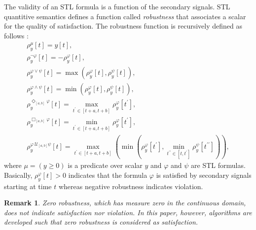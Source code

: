 \documentclass[letterpaper, 10 pt, conference]{ieeeconf}
\newtheorem{remark}{Remark}
\begin{document}
The validity of an STL formula is a function of the secondary signals. STL quantitive semantics defines a function called \emph{robustness} that associates a scalar for the quality of satisfaction. The robustness function is recursively defined as follows \cite{donze}:
\begin{equation}
\label{eq:semantics}
\begin{array}{l}
\rho_y^\mu[t]=y[t],
\\
\rho_y^{\neg \varphi} [t]=-\rho_y^\varphi[t], \\
\rho_y^{\varphi \vee \psi}[t]=\max (\rho_y^\varphi[t],\rho_y^\psi[t] ),
\\
\rho_y^{\varphi \wedge \psi} [t]=\min (\rho_y^\varphi[t],\rho_y^\psi[t] ),
\\
\rho_y^{\Diamond_{[a,b]} \varphi}[t]=\underset{t^\prime \in [t+a,t+b]} \max \rho_y^\varphi[t^\prime],
 \\
\rho_y^{\Box_{[a,b]} \varphi}[t]=\underset{t^\prime \in [t+a,t+b]} \min \rho_y^\varphi[t^\prime],
 \\
\rho_y^{\varphi~\mathcal{U}_{[a,b]} \psi}[t]=  \underset{t^\prime \in [t+a,t+b]} \max \left( \min (\rho_y^\varphi[t^\prime], \underset{t^{\prime\prime} \in [t,t^\prime]} \min \rho_y^\psi[t^{\prime\prime}])\right ),
\end{array}
\end{equation}
where $\mu=(y \geq 0)$ is a predicate over scalar $y$ and $\varphi$ and $\psi$ are STL formulas. Basically, $\rho^\varphi_y[t] > 0$ indicates that the formula $\varphi$ is satisfied by secondary signals starting at time $t$ whereas negative robustness indicates violation.
\begin{remark}Zero robustness, which has measure zero in the continuous domain, does not indicate satisfaction nor violation. In this paper, however, algorithms are developed such that zero robustness is considered as satisfaction.
 \end{remark}
\end{document}
